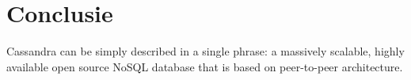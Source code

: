 \chapter{Conclusie}
\label{ch:conclusie}


Cassandra can be simply described in a single phrase: a massively scalable, highly
available open source NoSQL database that is based on peer-to-peer architecture. \citep{kan2014cassandra}